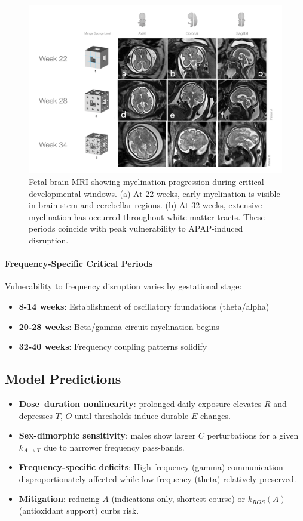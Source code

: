 \documentclass[12pt]{article}
\begin{document}
\begin{figure}[h]
\centering
\includegraphics[width=\textwidth]{../assets/menger-sponge-mri.jpg}
\caption{Fetal brain MRI showing myelination progression during critical developmental windows. (a) At 22 weeks, early myelination is visible in brain stem and cerebellar regions. (b) At 32 weeks, extensive myelination has occurred throughout white matter tracts. These periods coincide with peak vulnerability to APAP-induced disruption.}
\label{fig:fetalmri}
\end{figure}

\paragraph{Frequency-Specific Critical Periods}
Vulnerability to frequency disruption varies by gestational stage:
\begin{itemize}
\item \textbf{8-14 weeks}: Establishment of oscillatory foundations (theta/alpha)
\item \textbf{20-28 weeks}: Beta/gamma circuit myelination begins
\item \textbf{32-40 weeks}: Frequency coupling patterns solidify
\end{itemize}

\subsection{Model Predictions}
\begin{itemize}
\item \textbf{Dose--duration nonlinearity}: prolonged daily exposure elevates $R$ and depresses $T$, $O$ until thresholds induce durable $E$ changes.
\item \textbf{Sex-dimorphic sensitivity}: males show larger $C$ perturbations for a given $k_{A \rightarrow T}$ due to narrower frequency pass-bands.
\item \textbf{Frequency-specific deficits}: High-frequency (gamma) communication disproportionately affected while low-frequency (theta) relatively preserved.
\item \textbf{Mitigation}: reducing $A$ (indications-only, shortest course) or $k_{ROS}(A)$ (antioxidant support) curbs risk.
\end{itemize}
\end{document}
